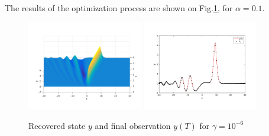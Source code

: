 The results  of the optimization process are shown on Fig.\ref{recoveredstate}, for $\alpha = 0.1$.
\begin{figure}[!h]
 \includegraphics[width = 0.45\textwidth]{images/ex1recoveredstate3d.pdf}
  \includegraphics[width = 0.45\textwidth]{images/ex1recoveredstate.pdf}
 \caption{Recovered state $y$ and final observation $y(T)$ for $\gamma = 10^{-6}$}
 \label{recoveredstate}
\end{figure}

